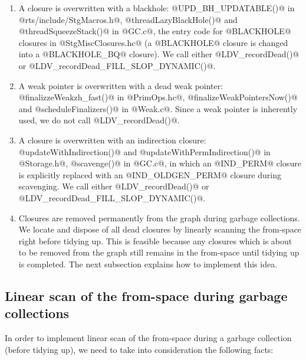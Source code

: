 \documentclass{article}
\begin{document}
\begin{enumerate}
\item A closure is overwritten with a blackhole: 
  @UPD_BH_UPDATABLE()@ in @rts/include/StgMacros.h@,
  @threadLazyBlackHole()@ and @threadSqueezeStack()@ in @GC.c@,
  the entry code for @BLACKHOLE@ closures in @StgMiscClosures.hc@ (a 
  @BLACKHOLE@ closure is changed into a @BLACKHOLE_BQ@ closure).
  We call either @LDV_recordDead()@ or @LDV_recordDead_FILL_SLOP_DYNAMIC()@.

\item A weak pointer is overwritten with a dead weak pointer:
  @finalizzeWeakzh_fast()@ in @PrimOps.hc@, 
  @finalizeWeakPointersNow()@ and @scheduleFinalizers()@ in @Weak.c@.
  Since a weak pointer is inherently used, we do not call @LDV_recordDead()@.

\item A closure is overwritten with an indirection closure:
  @updateWithIndirection()@ and @updateWithPermIndirection()@ in @Storage.h@,
  @scavenge()@ in @GC.c@, in which an @IND_PERM@ closure is explicitly replaced
  with an @IND_OLDGEN_PERM@ closure during scavenging.
  We call either @LDV_recordDead()@ or @LDV_recordDead_FILL_SLOP_DYNAMIC()@.
  
\item Closures are removed permanently from the graph during garbage
collections.  We locate and dispose of all dead closures by linearly
scanning the from-space right before tidying up.  This is feasible
because any closures which is about to be removed from the graph still
remains in the from-space until tidying up is completed.  The next
subsection explains how to implement this idea.
\end{enumerate}

\subsection{Linear scan of the from-space during garbage collections}

In order to implement linear scan of the from-space during a garbage collection 
(before tidying up),
we need to take into consideration the following facts:
\end{document}
